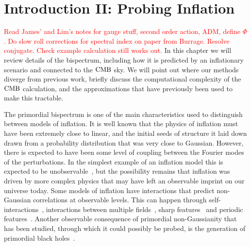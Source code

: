 %
\chapter{Introduction II: Probing Inflation}\label{chapter:intro_bispectra}
\textcolor{red}{Read James' and Lim's notes for gauge stuff, second order action, ADM, define $\Phi$.}
\textcolor{red}{Do slow roll corrections for spectral index on paper from Burrage. Resolve conjugate.
Check example calculation still works out.}
In this chapter we will review details of the bispectrum, including how it is predicted
by an inflationary scenario and connected to the $\text{CMB}$ sky.
We will point out where our methods diverge from previous work,
briefly discuss the computational complexity of the $\text{CMB}$ calculation, and
the approximations that have previously been used to make this tractable.


The primordial bispectrum is one of the main
characteristics used to distinguish between models of inflation. It is well
known that the physics of inflation must have been extremely close
to linear, and the initial seeds of structure it laid down
drawn from a probability distribution that was
very close to Gaussian. However, there is expected to have been some level of coupling
between the Fourier modes of the perturbations.
In the simplest example of an inflation model this is
expected to be unobservable~\cite{Maldacena},
but the possibility remains that inflation was driven by
more complex physics that may have left an observable imprint on our universe today.
Some models of inflation have interactions that predict non-Gaussian
correlations at observable levels. This can happen through
self-interactions~\cite{px_burrage,dbi_in_the_sky},
interactions between multiple fields~\cite{Byrnes_2010, Gao_turn,
achucarro_multifield1, achucarro_multifield2, achucarro_robust_16, achucarro_natural,
achucarro_quad_viability, achucarro_gsr_cs_14, achucarro_cs_reduction_13,
achucarro_gong_cs_corr, achucarro_cs_12, achucarro_eft, curvaton_comprehensive},
sharp features~\cite{adshead, gsr, step_novaes}
and periodic features~\cite{flauger_pajer_resonant, Pajer_2013, Meerburg_2012, Meerburg_osc, Meerburg_2010,
Barnaby_2011, Peiris_2013, Easther_2013, Cabass_2018, Behbahani_2011}.
Another observable consequence of primordial non-Gaussianity
that has been studied,
through which it could possibly be probed, is the generation of primordial black
holes~\cite{pbh_byrnes, pbh_young, pbh_franciolini, pbh_passaglia}.



